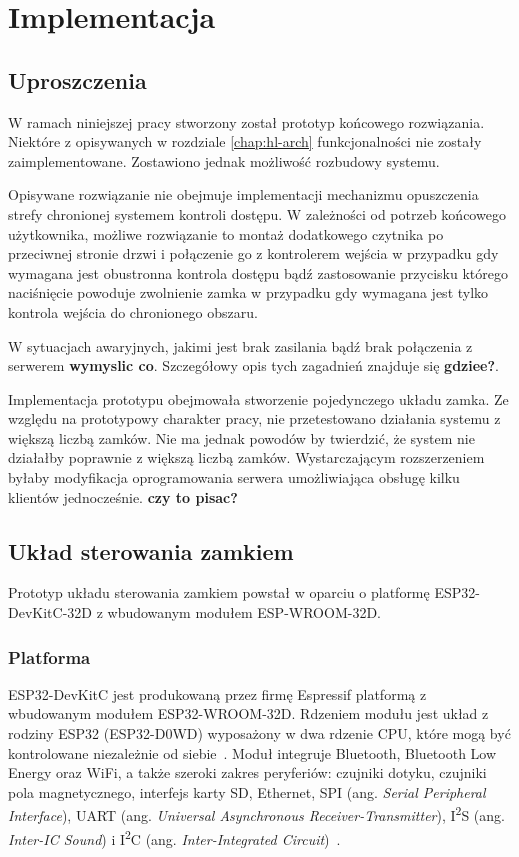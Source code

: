 \chapter{Implementacja}
\label{chap:implementation}

\section{Uproszczenia}

W ramach niniejszej pracy stworzony został prototyp końcowego rozwiązania. Niektóre z opisywanych w rozdziale \ref{chap:hl-arch} funkcjonalności nie zostały zaimplementowane. Zostawiono jednak możliwość rozbudowy systemu.

Opisywane rozwiązanie nie obejmuje implementacji mechanizmu opuszczenia strefy chronionej systemem kontroli dostępu. W zależności od potrzeb końcowego użytkownika, możliwe rozwiązanie to montaż dodatkowego czytnika po przeciwnej stronie drzwi i połączenie go z kontrolerem wejścia w przypadku gdy wymagana jest obustronna kontrola dostępu bądź zastosowanie przycisku którego naciśnięcie powoduje zwolnienie zamka w przypadku gdy wymagana jest tylko kontrola wejścia do chronionego obszaru.

W sytuacjach awaryjnych, jakimi jest brak zasilania bądź brak połączenia z serwerem \textbf{wymyslic co}. Szczegółowy opis tych zagadnień znajduje się \textbf{gdziee?}.

Implementacja prototypu obejmowała stworzenie pojedynczego układu zamka. Ze względu na prototypowy charakter pracy, nie przetestowano działania systemu z większą liczbą zamków. Nie ma jednak powodów by twierdzić, że system nie działałby poprawnie z większą liczbą zamków. Wystarczającym rozszerzeniem byłaby modyfikacja oprogramowania serwera umożliwiająca obsługę kilku klientów jednocześnie. \textbf{czy to pisac?}

\section{Układ sterowania zamkiem}

Prototyp układu sterowania zamkiem powstał w oparciu o platformę ESP32-DevKitC-32D z wbudowanym modułem ESP-WROOM-32D.

\subsection{Platforma}

ESP32-DevKitC jest produkowaną przez firmę Espressif platformą z wbudowanym modułem ESP32-WROOM-32D. Rdzeniem modułu jest układ z rodziny ESP32 (ESP32-D0WD) wyposażony w dwa rdzenie CPU, które mogą być kontrolowane niezależnie od siebie~\cite{esp32-wroom32-ds}. Moduł integruje Bluetooth, Bluetooth Low Energy oraz WiFi, a także szeroki zakres peryferiów: czujniki dotyku, czujniki pola magnetycznego, interfejs karty SD, Ethernet, SPI (ang. \textit{Serial Peripheral Interface}), UART (ang. \textit{Universal Asynchronous Receiver-Transmitter}), I\textsuperscript{2}S (ang. \textit{Inter-IC Sound}) i I\textsuperscript{2}C (ang. \textit{Inter-Integrated Circuit})~\cite{esp32-wroom32-ds}.

